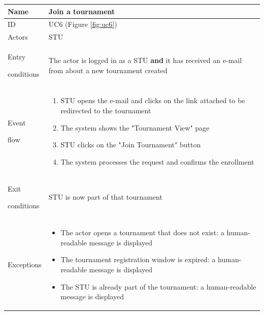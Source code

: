 \begin{center}
    \def\arraystretch{1.5}
    \begin{tabular}{| m{2cm} | m{10cm}|}
        \hline
        Name                  & Join a tournament                                                                                           \\ \hline
        ID                    & UC6 (Figure \ref{fig:uc6})                                                                                  \\ \hline
        Actors                & STU                                                                                                         \\ \hline
        Entry \par conditions & The actor is logged in as a STU \textbf{and} it has received an e-mail from about a new tournament created  \\ \hline
        Event \par flow       & \begin{enumerate}
                                    \item STU opens the e-mail and clicks on the link attached to be redirected to the tournament
                                    \item The system shows the "Tournament View" page
                                    \item STU clicks on the "Join Tournament" button
                                    \item The system processes the request and confirms the enrollment
                                \end{enumerate}                                                                                             \\ \hline
        Exit \par conditions  & STU is now part of that tournament                                                                          \\ \hline
        Exceptions            & \begin{itemize}
                                    \item The actor opens a tournament that does not exist: a human-readable message is displayed
                                    \item The tournament registration window is expired: a human-readable message is displayed
                                    \item The STU is already part of the tournament: a human-readable message is displayed
                                \end{itemize}                                                                                               \\ \hline
    \end{tabular}
\end{center}

